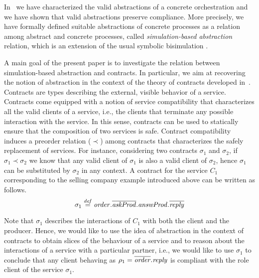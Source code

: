 \documentclass[submission,copyright,creativecommons]{eptcs}
\newcommand{\bydef}{\stackrel{\scriptstyle{\it def}}{=}}
\begin{document}
In~\cite{BM:APOL} we have characterized the valid abstractions of a 
concrete orchestration and we have shown that valid abstractions preserve
compliance. More precisely, we have formally defined suitable abstractions of concrete processes
as a relation among abstract and concrete processes, called \emph{simulation-based abstraction} relation,
which is an extension of the usual symbolic bisimulation \cite{HL:SB,BD:SSPC}. 

A main goal of the present paper is to investigate the relation between simulation-based abstraction 
and contracts. In particular, we aim at recovering the notion of abstraction in the context of 
the theory of contracts developed in~\cite{CGP09:TCWS}. 
Contracts are types describing the external, visible behavior of a service. Contracts come 
equipped with a notion of service compatibility that characterizes all the valid clients of a service, i.e., 
the clients that terminate any possible interaction with the service. 
In this sense, contracts can be used to statically ensure that the composition of two services
is safe. Contract compatibility induces a preorder relation ($\prec$) among contracts that characterizes 
the safely replacement of services. For instance,  considering two contracts $\sigma_1$ and $\sigma_2$, if 
$\sigma_1\prec\sigma_2$ we know that any valid client of $\sigma_1$ is also a valid client of $\sigma_2$,
hence $\sigma_1$ can be substituted by $\sigma_2$ in any context. 
A contract for the service ${C_1}$ corresponding to the selling company example introduced above can be 
written as follows. 
\[
{\sigma_1}\bydef{\it order}.\overline{\it askProd}.{\it answProd}.\overline{\it reply}
\]

Note that $\sigma_1$ describes the interactions of $C_1$ with both the client and the producer. 
Hence, we would like to use the idea of abstraction in the context of contracts to obtain
slices of the behaviour of a service and to reason about the interactions of a 
service with a particular partner, i.e., we would like to use $\sigma_1$ to conclude that 
any client behaving as $\rho_1 = \overline{\it order}.{\it reply}$ is compliant with the role 
client of the service $\sigma_1$. 
\end{document}
